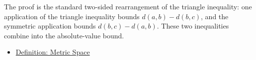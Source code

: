 \begin{remark*}
The proof is the standard two-sided rearrangement of the triangle inequality:
one application of the triangle inequality bounds
\(d(a,b)-d(b,c)\), and the symmetric application bounds
\(d(b,c)-d(a,b)\).  These two inequalities combine into the absolute-value
bound.
\end{remark*}

\begin{dependencies}
\begin{itemize}
  \item \hyperref[def:metric-space]{Definition: Metric Space}
\end{itemize}
\end{dependencies}

\clearpage

